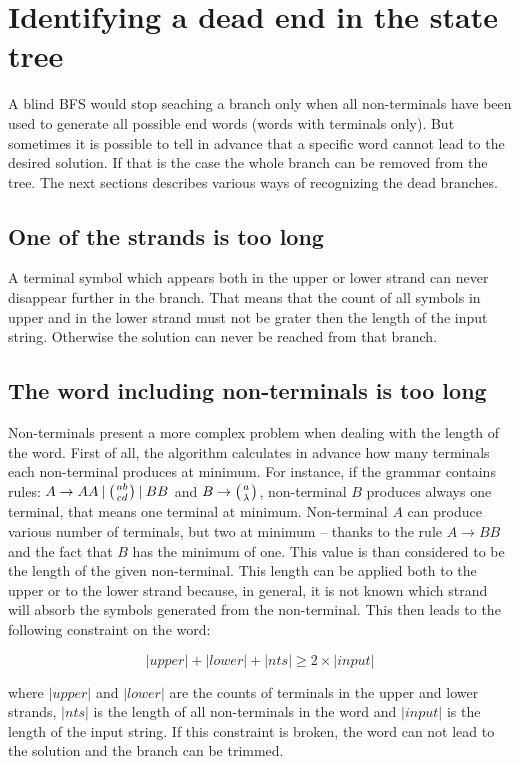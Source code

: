 \section{Identifying a dead end in the state tree}
A blind BFS would stop seaching a branch only when all non-terminals have been used to generate all possible end words (words with terminals only). But sometimes it is possible to tell in advance that a specific word cannot lead to the desired solution. If that is the case the whole branch can be removed from the tree. The next sections describes various ways of recognizing the dead branches.

\subsection{One of the strands is too long}
A terminal symbol which appears both in the upper or lower strand can never disappear further in the branch. That means that the count of all symbols in upper and in the lower strand must not be grater then the length of the input string. Otherwise the solution can never be reached from that branch.

\subsection{The word including non-terminals is too long}
Non-terminals present a more complex problem when dealing with the length of the word. First of all, the algorithm calculates in advance how many terminals each non-terminal produces at minimum. For instance, if the grammar contains rules: $A \rightarrow A A \:|\: \wkpair{ab}{cd} \:|\: B B$ and $B \rightarrow \wkpair{a}{\lambda}$, non-terminal $B$ produces always one terminal, that means one terminal at minimum. Non-terminal $A$ can produce various number of terminals, but two at minimum -- thanks to the rule $A \rightarrow B B$ and the fact that $B$ has the minimum of one. This value is than considered to be the length of the given non-terminal.
This length can be applied both to the upper or to the lower strand because, in general, it is not known which strand will absorb the symbols generated from the non-terminal.
This then leads to the following constraint on the word:

$$|upper| + |lower| + |nts| \geq 2 \times |input|$$

where $|upper|$ and $|lower|$ are the counts of terminals in the upper and lower strands, $|nts|$ is the length of all non-terminals in the word and $|input|$ is the length of the input string. If this constraint is broken, the word can not lead to the solution and the branch can be trimmed.


